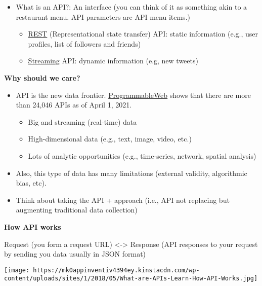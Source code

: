 \documentclass[
]{book}
\begin{document}
\begin{itemize}
\item
  What is an API?: An interface (you can think of it as something akin to a restaurant menu. API parameters are API menu items.)

  \begin{itemize}
  \item
    \href{https://en.wikipedia.org/wiki/Representational_state_transfer}{REST} (Representational state transfer) API: static information (e.g., user profiles, list of followers and friends)
  \item
    \href{https://blog.axway.com/amplify/api-management/streaming-apis\#:~:text=Streaming\%20APIs\%20are\%20used\%20to,a\%20subset\%20of\%20Streaming\%20APIS.}{Streaming} API: dynamic information (e.g, new tweets)
  \end{itemize}
\end{itemize}

\textbf{Why should we care?}

\begin{itemize}
\item
  API is the new data frontier. \href{https://www.programmableweb.com/apis/directory}{ProgrammableWeb} shows that there are more than 24,046 APIs as of April 1, 2021.

  \begin{itemize}
  \item
    Big and streaming (real-time) data
  \item
    High-dimensional data (e.g., text, image, video, etc.)
  \item
    Lots of analytic opportunities (e.g., time-series, network, spatial analysis)
  \end{itemize}
\item
  Also, this type of data has many limitations (external validity, algorithmic bias, etc).
\item
  Think about taking the API + approach (i.e., API not replacing but augmenting traditional data collection)
\end{itemize}

\textbf{How API works}

Request (you form a request URL) \textless-\textgreater{} Response (API responses to your request by sending you data usually in JSON format)

\texttt{[image: https://mk0appinventiv4394ey.kinstacdn.com/wp-content/uploads/sites/1/2018/05/What-are-APIs-Learn-How-API-Works.jpg]}
\end{document}
